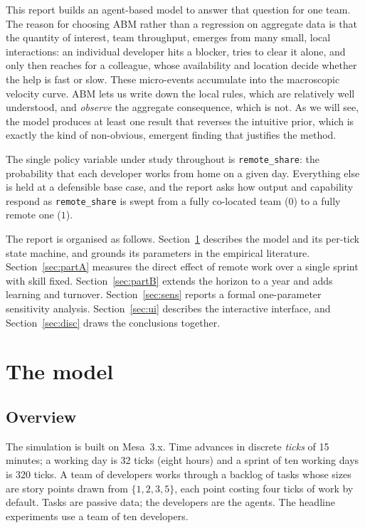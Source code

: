 \documentclass[11pt,a4paper]{article}
\begin{document}
This report builds an agent-based model to answer that question for one team. The reason for
choosing ABM rather than a regression on aggregate data is that the quantity of interest, team
throughput, emerges from many small, local interactions: an individual developer hits a blocker,
tries to clear it alone, and only then reaches for a colleague, whose availability and location
decide whether the help is fast or slow. These micro-events accumulate into the macroscopic
velocity curve. ABM lets us write down the local rules, which are relatively well understood, and
\emph{observe} the aggregate consequence, which is not. As we will see, the model produces at least
one result that reverses the intuitive prior, which is exactly the kind of non-obvious, emergent
finding that justifies the method.

The single policy variable under study throughout is \texttt{remote\_share}: the probability that
each developer works from home on a given day. Everything else is held at a defensible base case,
and the report asks how output and capability respond as \texttt{remote\_share} is swept from a
fully co-located team ($0$) to a fully remote one ($1$).

The report is organised as follows. Section~\ref{sec:model} describes the model and its per-tick
state machine, and grounds its parameters in the empirical literature. Section~\ref{sec:partA}
measures the direct effect of remote work over a single sprint with skill fixed. Section~\ref{sec:partB}
extends the horizon to a year and adds learning and turnover. Section~\ref{sec:sens} reports a
formal one-parameter sensitivity analysis. Section~\ref{sec:ui} describes the interactive interface,
and Section~\ref{sec:disc} draws the conclusions together.

\section{The model}
\label{sec:model}

\subsection{Overview}

The simulation is built on Mesa~3.x. Time advances in discrete \emph{ticks} of 15 minutes; a working
day is 32 ticks (eight hours) and a sprint of ten working days is 320 ticks. A team of developers
works through a backlog of tasks whose sizes are story points drawn from $\{1,2,3,5\}$, each point
costing four ticks of work by default. Tasks are passive data; the developers are the agents. The
headline experiments use a team of ten developers.
\end{document}
